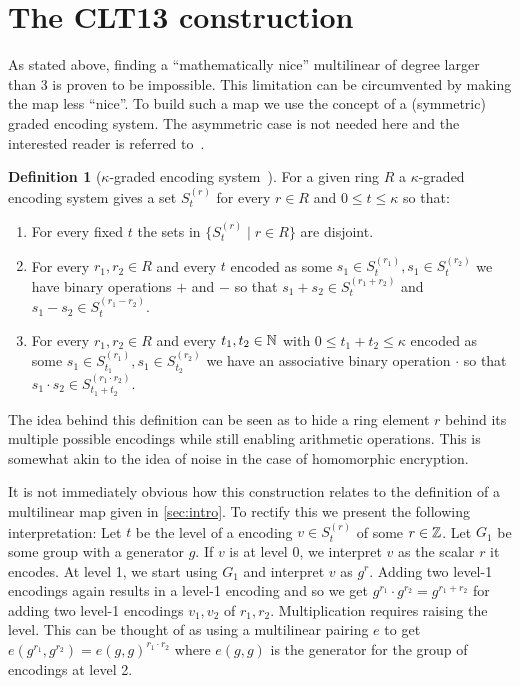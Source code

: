 \documentclass[english]{scrartcl}
\theoremstyle{plain}
\theoremstyle{definition}
\newtheorem{definition}{Definition}
\begin{document}
    \section{The CLT13 construction}
    As stated above, finding a \enquote{mathematically nice} multilinear of degree larger than 3 is proven to be impossible. This limitation can be circumvented by making the map less \enquote{nice}.
    To build such a map we use the concept of a (symmetric) graded encoding system. The asymmetric case is not needed here and the interested reader is referred to~\cite{cryptoeprint:mm_gentry}.
    \begin{definition}[$\kappa$-graded encoding system~\cite{cryptoeprint:2013:183}]
        For a given ring $R$ a $\kappa$-graded encoding system gives a set $S^{(r)}_t$ for every $r \in R$ and $0 \leq t \leq \kappa$ so that:
        \begin{enumerate}
            \item For every fixed $t$ the sets in $\{ S^{(r)}_t \mid r \in R \}$ are disjoint.
            \item For every $r_1, r_2 \in R$ and every $t$ encoded as some $s_1 \in S^{(r_1)}_t, s_1 \in S^{(r_2)}_t$ we have binary operations $+$ and $-$ so that $s_1 + s_2 \in S^{(r_1 + r_2)}_t$ and $s_1 - s_2 \in S^{(r_1 - r_2)}_t$.
            \item For every $r_1, r_2 \in R$ and every $t_1, t_2 \in \mathbb{N}$ with $0 \leq t_1 + t_2 \leq \kappa$ encoded as some $s_1 \in S^{(r_1)}_{t_1}, s_1 \in S^{(r_2)}_{t_2}$ we have an associative binary operation $\cdot$ so that $s_1 \cdot s_2 \in S^{(r_1 \cdot r_2)}_{t_1 + t_2}$.
        \end{enumerate}
    \end{definition}

    The idea behind this definition can be seen as to hide a ring element $r$ behind its multiple possible encodings while still enabling arithmetic operations. This is somewhat akin to the idea of noise in the case of homomorphic encryption.

    It is not immediately obvious how this construction relates to the definition of a multilinear map given in \cref{sec:intro}. To rectify this we present the following interpretation:
    Let $t$ be the level of a encoding $v \in S^{(r)}_t$ of some $r \in \mathbb{Z}$. Let $G_1$ be some group with a generator $g$. If $v$ is at level 0, we interpret $v$ as the scalar $r$ it encodes. At level 1, we start using $G_1$ and interpret $v$ as $g^r$. Adding two level-1 encodings again results in a level-1 encoding and so we get $g^{r_1} \cdot g^{r_2} = g^{r_1 + r_2}$ for adding two level-1 encodings $v_1, v_2$ of $r_1, r_2$.
    Multiplication requires raising the level. This can be thought of as using a multilinear pairing $e$ to get $e(g^{r_1}, g^{r_2}) = e(g, g)^{r_1 \cdot r_2}$ where $e(g,g)$ is the generator for the group of encodings at level 2.~\cite{zimmerman}
\end{document}
